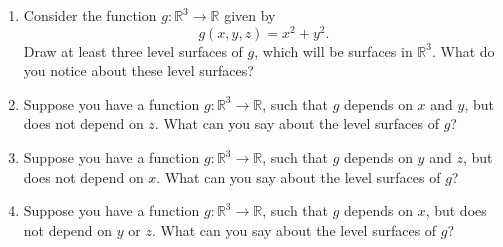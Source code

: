 \begin{problem}

\begin{enumerate}
\item Consider the function $g:\mathbb{R}^3\rightarrow\mathbb{R}$ given by
\[
g(x,y,z) = x^2+y^2.
\]
Draw at least three level surfaces of $g$, which will be surfaces in $\mathbb{R}^3$. What do you notice about these level surfaces?
\item Suppose you have a function $g:\mathbb{R}^3\rightarrow\mathbb{R}$, such that $g$ depends on $x$ and $y$, but does not depend on $z$. What can you say about the level surfaces of $g$? 
\item Suppose you have a function $g:\mathbb{R}^3\rightarrow\mathbb{R}$, such that $g$ depends on $y$ and $z$, but does not depend on $x$. What can you say about the level surfaces of $g$? 
\item Suppose you have a function $g:\mathbb{R}^3\rightarrow\mathbb{R}$, such that $g$ depends on $x$, but does not depend on $y$ or $z$. What can you say about the level surfaces of $g$? 
\end{enumerate}
\end{problem}
